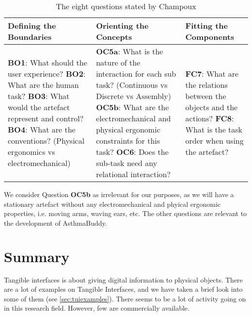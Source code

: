\begin{table}[h]
	\begin{tabular}{| p{5.0cm} | p{5.0cm} | p{5.0cm} |}
	\hline
	\textbf{Defining the Boundaries} & \textbf{Orienting the Concepts} & \textbf{Fitting the Components} \\
	\hline
	\textbf{BO1}: What should the user experience? \newline
	\textbf{BO2}: What are the human task? \newline
	\textbf{BO3}: What would the artefact represent and control? \newline 
	\textbf{BO4}: What are the conventions? (Physical ergonomics vs electromechanical) \newline 
	&
	\textbf{OC5a}: What is the nature of the interaction for each sub task? (Continuous vs Discrete vs Assembly) \newline
	\textbf{OC5b}: What are the electromechanical and physical ergonomic constraints for this task? \newline
	\textbf{OC6}: Does the sub-task need any relational interaction? \newline
	&
	\textbf{FC7}: What are the relations between the objects and the actions? \newline 
	\textbf{FC8}: What is the task order when using the artefact? \\ 
	\hline
	
	\end{tabular}
	\caption{The eight questions stated by Champoux\cite{subramaniandesign}}
	\label{tab:tuidesign}
\end{table}  

We consider Question \textbf{OC5b} as irrelevant for our purposes, as we will have a stationary artefact without any electromechanical and phyical ergonomic properties, i.e. moving arms, waving ears, etc. The other questions are relevant to the development of AsthmaBuddy.



\section{Summary}
\label{sec:tangiblesummary}


Tangible interfaces is about giving digital information to physical objects. There are a lot of examples on Tangible Interfaces, and we have taken a brief look into some of them (see \ref{sec:tuiexamples}). There seems to be a lot of activity going on in this research field. However, few are commercially available. 


